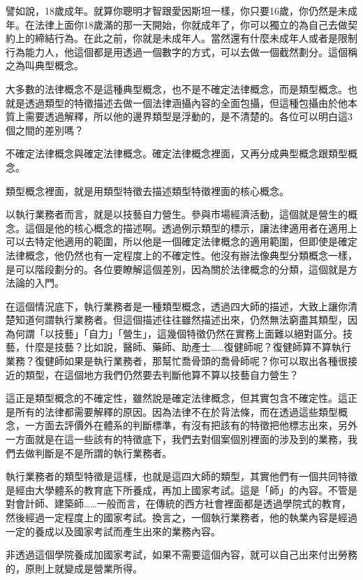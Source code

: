 \documentclass[oneside,sub3section]{ctexbook}
\begin{document}
譬如說，18歲成年。就算你聰明才智跟愛因斯坦一樣，你只要16歲，你仍然是未成年。在法律上面你18歲滿的那一天開始，你就成年了，你可以獨立的為自己去做契約上的締結行為。在此之前，你就是未成年人。當然還有什麼未成年人或者是限制行為能力人，他這個都是用透過一個數字的方式，可以去做一個截然劃分。這個稱之為叫典型概念。

大多數的法律概念不是這種典型概念，也不是不確定法律概念，而是類型概念。也就是透過類型的特徵描述去做一個法律涵攝內容的全面包攝，但這種包攝由於他本質上需要透過解釋，所以他的邊界類型是浮動的，是不清楚的。各位可以明白這3個之間的差別嗎？

不確定法律概念與確定法律概念。確定法律概念裡面，又再分成典型概念跟類型概念。

類型概念裡面，就是用類型特徵去描述類型特徵裡面的核心概念。

以執行業務者而言，就是以技藝自力營生。參與市場經濟活動，這個就是營生的概念。這個是他的核心概念的描述啊。透過例示類型的標示，讓法律適用者在適用上可以去特定他適用的範圍，所以他是一個確定法律概念的適用範圍，但即使是確定法律概念，他仍然也有一定程度上的不確定性。他沒有辦法像典型分類概念一樣，是可以階段劃分的。各位要瞭解這個差別，因為關於法律概念的分類，這個就是方法論的入門。

在這個情況底下，執行業務者是一種類型概念，透過四大師的描述，大致上讓你清楚知道何謂執行業務者。但這個描述往往雖然描述出來，仍然無法窮盡其類型，因為何謂「以技藝」「自力」「營生」，這幾個特徵仍然在實務上面難以絕對區分。技藝，什麼是技藝？比如說，醫師、藥師、助產士\ldots\ldots 復健師呢？復健師算不算執行業務？復健師如果是執行業務者，那幫忙喬骨頭的喬骨師呢？你可以取出各種很接近的類型，在這個地方我們仍然要去判斷他算不算以技藝自力營生？

這正是類型概念的不確定性，雖然說是確定法律概念，但其實包含不確定性。這正是所有的法律都需要解釋的原因。因為法律不在於背法條，而在透過這些類型概念，一方面去評價外在體系的判斷標準，有沒有把該有的特徵把他標志出來，另外一方面就是在這一些該有的特徵底下，我們去對個案個別裡面的涉及到的業務，我們去做判斷是不是所謂的執行業務者。

執行業務者的類型特徵是這樣，也就是這四大師的類型，其實他們有一個共同特徵是經由大學體系的教育底下所養成，再加上國家考試。這是「師」的內容。不管是對會計師、建築師\ldots\ldots 一般而言，在傳統的西方社會裡面都是透過學院式的教育，然後經過一定程度上的國家考試。換言之，一個執行業務者，他的執業內容是經過一定的養成以及國家考試而產生出來的業務內容。

非透過這個學院養成加國家考試，如果不需要這個內容，就可以自己出來付出勞務的，原則上就變成是營業所得。
\end{document}
